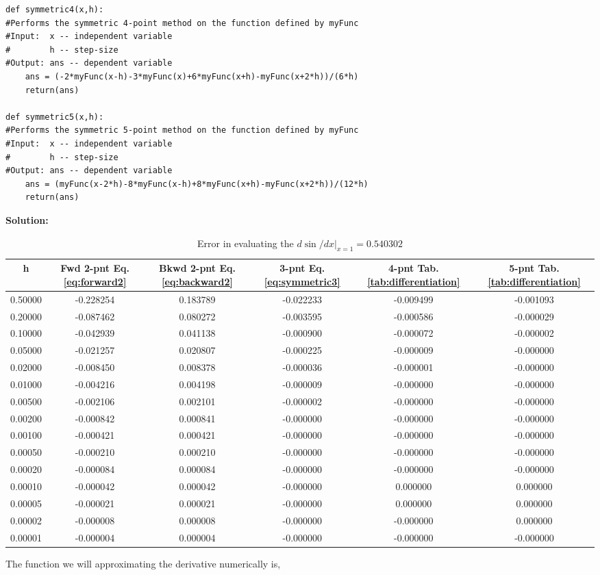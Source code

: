 \documentclass[10pt]{article}
\begin{document}
\begin{lstlisting}
def symmetric4(x,h):
#Performs the symmetric 4-point method on the function defined by myFunc
#Input:  x -- independent variable
#        h -- step-size
#Output: ans -- dependent variable
    ans = (-2*myFunc(x-h)-3*myFunc(x)+6*myFunc(x+h)-myFunc(x+2*h))/(6*h)
    return(ans)

def symmetric5(x,h):
#Performs the symmetric 5-point method on the function defined by myFunc
#Input:  x -- independent variable
#        h -- step-size
#Output: ans -- dependent variable
    ans = (myFunc(x-2*h)-8*myFunc(x-h)+8*myFunc(x+h)-myFunc(x+2*h))/(12*h)
    return(ans)
\end{lstlisting}
\label{solution:1.1}\textbf{Solution:}
\begin{table}[!ht]
	\begin{center}
	\caption{Error in evaluating the $d \sin /dx|_{x=1}=0.540302$}
		\label{tab:diff_errors}
		\begin{tabular}{|cccccc|}
		\hline
		h & Fwd 2-pnt Eq. \ref{eq:forward2} & Bkwd 2-pnt Eq. \ref{eq:backward2} & 3-pnt Eq. \ref{eq:symmetric3} & 4-pnt Tab. \ref{tab:differentiation} & 5-pnt Tab. \ref{tab:differentiation} \\
		\hline
		0.50000&-0.228254&0.183789&-0.022233&-0.009499&-0.001093\\ 
		0.20000&-0.087462&0.080272&-0.003595&-0.000586&-0.000029\\ 
		0.10000&-0.042939&0.041138&-0.000900&-0.000072&-0.000002\\ 
		0.05000&-0.021257&0.020807&-0.000225&-0.000009&-0.000000\\ 
		0.02000&-0.008450&0.008378&-0.000036&-0.000001&-0.000000\\ 
		0.01000&-0.004216&0.004198&-0.000009&-0.000000&-0.000000\\ 
		0.00500&-0.002106&0.002101&-0.000002&-0.000000&-0.000000\\ 
		0.00200&-0.000842&0.000841&-0.000000&-0.000000&-0.000000\\ 
		0.00100&-0.000421&0.000421&-0.000000&-0.000000&-0.000000\\ 
		0.00050&-0.000210&0.000210&-0.000000&-0.000000&-0.000000\\ 
		0.00020&-0.000084&0.000084&-0.000000&-0.000000&-0.000000\\ 
		0.00010&-0.000042&0.000042&-0.000000&0.000000&0.000000\\ 
		0.00005&-0.000021&0.000021&-0.000000&0.000000&0.000000\\ 
		0.00002&-0.000008&0.000008&-0.000000&-0.000000&0.000000\\ 
		0.00001&-0.000004&0.000004&-0.000000&-0.000000&-0.000000\\ 
		\hline
		\end{tabular}
	\end{center}
\end{table}
The function we will approximating the derivative numerically is,
\end{document}
